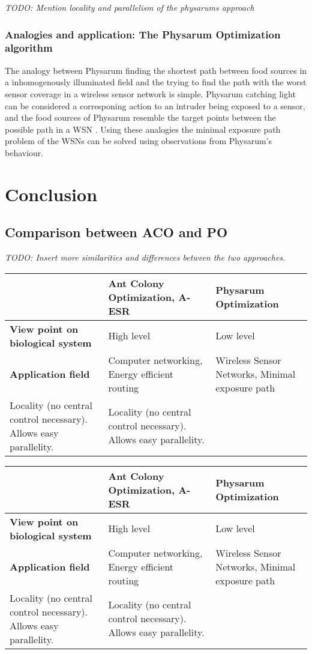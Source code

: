 \documentclass{IWORK2014}
\begin{document}
\textit{TODO: Mention locality and parallelism of the physarums approach}
\subsubsection{Analogies and application: The Physarum Optimization algorithm}
The analogy between Physarum finding the shortest path between food sources in a inhomogenously illuminated field and the trying to find the path with the worst sensor coverage in a wireless sensor network is simple. Physarum catching light can be considered a corresponing action to an intruder being exposed to a sensor, and the food sources of Physarum resemble the target points between the possible path in a WSN \cite{liu2012physarum}. Using these analogies the minimal exposure path problem of the WSNs can be solved using observations from Physarum's behaviour.

\section{Conclusion}

\subsection{Comparison between ACO and PO}
\textit{TODO: Insert more similarities and differences between the two approaches.}

\begin{tabularx}{\linewidth}{|l|l|l|}
\hline & \textbf{Ant Colony Optimization, A-ESR} & \textbf{Physarum Optimization} \\ \hline
\textbf{View point on biological system} & High level & Low level \\ \hline
\textbf{Application field} & Computer networking, Energy efficient routing & Wireless Sensor Networks, Minimal exposure path \\ \hline
Locality (no central control necessary). Allows easy parallelity. & Locality (no central control necessary). Allows easy parallelity. \\ \hline
\end{tabularx}

\begin{table}[h]
\begin{tabular}{|l|l|l|}
\hline
                                         & \textbf{Ant Colony Optimization, A-ESR}       & \textbf{Physarum Optimization}              \\ \hline
\textbf{View point on biological system} & High level                                    & Low level                                   \\ \hline
\textbf{Application field}               & Computer networking, Energy efficient routing & Wireless Sensor Networks, Minimal exposure path \\ \hline
Locality (no central control necessary). Allows easy parallelity. & Locality (no central control necessary). Allows easy parallelity. \\ \hline
\end{tabular}
\end{table}
\end{document}
